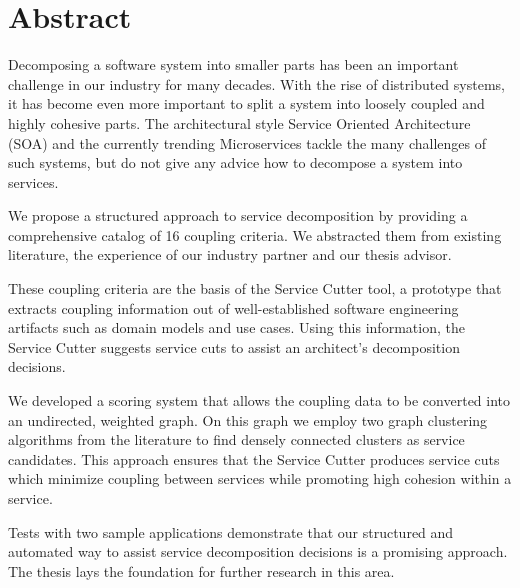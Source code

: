 \chapter{Abstract}

Decomposing a software system into smaller parts has been an important challenge in our industry for many decades. With the rise of distributed systems, it has become even more important to split a system into loosely coupled and highly cohesive parts. The architectural style Service Oriented Architecture (SOA) and the currently trending Microservices tackle the many challenges of such systems, but do not give any advice how to decompose a system into services.

We propose a structured approach to service decomposition by providing a comprehensive catalog of 16 coupling criteria. We abstracted them from existing literature, the experience of our industry partner and our thesis advisor. 

These coupling criteria are the basis of the Service Cutter tool, a prototype that extracts coupling information out of well-established software engineering artifacts such as domain models and use cases. Using this information, the Service Cutter suggests service cuts to assist an architect’s decomposition decisions. 

We developed a scoring system that allows the coupling data to be converted into an undirected, weighted graph. On this graph we employ two graph clustering algorithms from the literature to find densely connected clusters as service candidates. This approach ensures that the Service Cutter produces service cuts which minimize coupling between services while promoting high cohesion within a service.

Tests with two sample applications demonstrate that our structured and automated way to assist service decomposition decisions is a promising approach. The thesis lays the foundation for further research in this area.